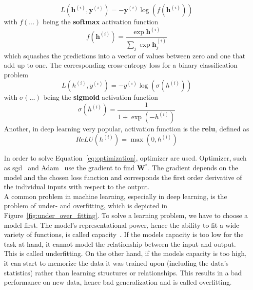 \begin{equation}
    L(\mathbf{h}^{(i)}, \mathbf{y}^{(i)}) = -\mathbf{y}^{(i)} \log(f(\mathbf{h}^{(i)}))
    \label{eq:cross_entropy_multi}
\end{equation}
with $f(...)$ being the \textbf{softmax} activation function
\begin{equation}
   f(\mathbf{h}^{(i)}) = \frac{\exp\mathbf{h}^{(i)}}{\sum_{j} \exp{\mathbf{h}^{(i)}_{j}}}
   \label{eq:softmax}
\end{equation}
which squashes the predictions into a vector of values between zero and one that add up to one. The corresponding cross-entropy loss for a binary classification problem
\begin{equation}
    L({h}^{(i)}, {y}^{(i)}) = -{y}^{(i)} \log(\sigma({h}^{(i)}))
    \label{eq:cross_entropy_binary}
\end{equation}
with $\sigma(...)$ being the \textbf{sigmoid} activation function
\begin{equation}
   \sigma({h}^{(i)}) = \frac{1}{1 + \exp{(-{h}^{(i)})}}
   \label{eq:sigmoid}
\end{equation}
Another, in deep learning very popular, activation function is the \textbf{\gls{relu}}, defined as
\begin{equation}
   ReLU({h}^{(i)}) = \max(0, {h}^{(i)})
   \label{eq:relu}
\end{equation}

In order to solve Equation~\ref{eq:optimization}, optimizer are used. Optimizer, such as \gls{sgd}~\cite{Goodfellow2016DeepLearning} and Adam~\cite{Kingma2014Adam:Optimization} use the gradient to find $\textbf{W}^*$. The gradient depends on the model and the chosen loss function and corresponds the first order derivative of the individual inputs with respect to the output.\\

A common problem in machine learning, especially in deep learning, is the problem of under- and overfitting, which is depicted in Figure~\ref{fig:under_over_fitting}. To solve a learning problem, we have to choose a model first. The model's representational power, hence the ability to fit a wide variety of functions, is called capacity~\cite{Goodfellow2016DeepLearning}. If the models capacity is too low for the task at hand, it cannot model the relationship between the input and output. This is called underfitting. On the other hand, if the models capacity is too high, it can start to memorize the data it was trained upon (including the data's statistics) rather than learning structures or relationships. This results in a bad performance on new data, hence bad generalization and is called overfitting.

